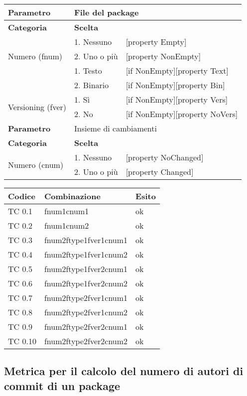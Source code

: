 \begin{tabular}{|p{4cm}|p{4cm}p{5cm}|}
	\hline
	\cellcolor{Gray} \textbf{Parametro}				& \multicolumn{2}{l|}{File del package}							\tabularnewline
	\hline
	\rowcolor{Gray}
	\textbf{Categoria}						& \textbf{Scelta}			&						\tabularnewline
	\hline
	\multirow{3}{*}{Numero (fnum)}					& 1. Nessuno				&	[property Empty] 			\tabularnewline
									\cline{2-3}
									& 2. Uno o più				&	[property NonEmpty]			\tabularnewline
	\hline
	\multirow{2}{*}{Tipo (ftype)}					& 1. Testo				&	[if NonEmpty][property Text] 		\tabularnewline
									\cline{2-3}
									& 2. Binario				&	[if NonEmpty][property Bin]		\tabularnewline
	\hline
	\multirow{2}{*}{Versioning (fver)}				& 1. Sì					&	[if NonEmpty][property Vers] 		\tabularnewline
									\cline{2-3}
									& 2. No					&	[if NonEmpty][property NoVers]		\tabularnewline
	\hline
	
	\cellcolor{Gray} \textbf{Parametro}				& \multicolumn{2}{l|}{Insieme di cambiamenti}						\tabularnewline
	\hline
	\rowcolor{Gray}
	\textbf{Categoria}						& \textbf{Scelta}			&						\tabularnewline
	\hline
	\multirow{3}{*}{Numero (cnum)}					& 1. Nessuno				&	[property NoChanged] 			\tabularnewline
									\cline{2-3}
									& 2. Uno o più				&	[property Changed]			\tabularnewline

	\hline
\end{tabular}

\vspace{1cm}

\begin{tabular}{|p{3cm}|p{7cm}|p{3cm}|}
	\hline
	\rowcolor{Gray}
	\textbf{Codice} & \textbf{Combinazione} & \textbf{Esito}\tabularnewline
	\hline
	TC 0.1			& fnum1cnum1			& ok \tabularnewline
	\hline
	TC 0.2			& fnum1cnum2			& ok \tabularnewline
	\hline
	TC 0.3			& fnum2ftype1fver1cnum1		& ok \tabularnewline
	\hline
	TC 0.4			& fnum2ftype1fver1cnum2		& ok \tabularnewline
	\hline
	TC 0.5			& fnum2ftype1fver2cnum1		& ok \tabularnewline
	\hline
	TC 0.6			& fnum2ftype1fver2cnum2		& ok \tabularnewline
	\hline
	TC 0.7			& fnum2ftype2fver1cnum1		& ok \tabularnewline
	\hline
	TC 0.8			& fnum2ftype2fver1cnum2		& ok \tabularnewline
	\hline
	TC 0.9			& fnum2ftype2fver2cnum1		& ok \tabularnewline
	\hline
	TC 0.10			&fnum2ftype2fver2cnum2		& ok \tabularnewline
	\hline
\end{tabular}
\clearpage




\subsection{Metrica per il calcolo del numero di autori di commit di un package}

